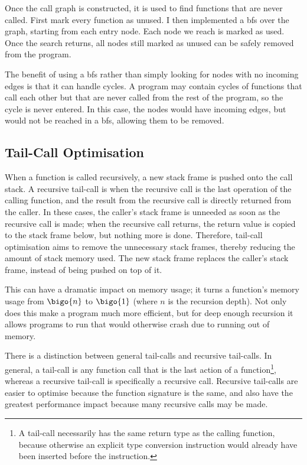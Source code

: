 \documentclass[00-main.tex]{subfiles}
\begin{document}
Once the call graph is constructed, it is used to find functions that are never called.
First mark every function as unused.
I then implemented a \gls{bfs} over the graph, starting from each entry node.
Each node we reach is marked as used.
Once the search returns, all nodes still marked as unused can be safely removed from the program.

The benefit of using a \gls{bfs} rather than simply looking for nodes with no incoming edges is that it can handle cycles.
A program may contain cycles of functions that call each other but that are never called from the rest of the program, so the cycle is never entered.
In this case, the nodes would have incoming edges, but would not be reached in a \gls{bfs}, allowing them to be removed.


\subsection{Tail-Call Optimisation}

When a function is called recursively, a new stack frame is pushed onto the call stack.
A recursive tail-call is when the recursive call is the last operation of the calling function, and the result from the recursive call is directly returned from the caller.
In these cases, the caller's stack frame is unneeded as soon as the recursive call is made; when the recursive call returns, the return value is copied to the stack frame below, but nothing more is done.
Therefore, tail-call optimisation aims to remove the unnecessary stack frames, thereby reducing the amount of stack memory used.
The new stack frame replaces the caller's stack frame, instead of being pushed on top of it.

This can have a dramatic impact on memory usage; it turns a function's memory usage from $\bigo{n}$ to $\bigo{1}$ (where $n$ is the recursion depth).
Not only does this make a program much more efficient, but for deep enough recursion it allows programs to run that would otherwise crash due to running out of memory.

There is a distinction between general tail-calls and recursive tail-calls. In general, a tail-call is any function call that is the last action of a function\footnote{A tail-call necessarily has the same return type as the calling function, because otherwise an explicit type conversion instruction would already have been inserted before the  instruction.}, whereas a recursive tail-call is specifically a recursive call.
Recursive tail-calls are easier to optimise because the function signature is the same, and also have the greatest performance impact because many recursive calls may be made.
\end{document}
